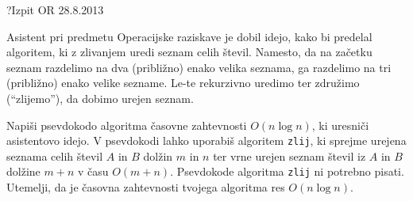 \begin{naloga}{?}{Izpit OR 28.8.2013}
\begin{vprasanje}
Asistent pri predmetu Operacijske raziskave je dobil idejo,
kako bi predelal algoritem, ki z zlivanjem uredi seznam celih števil.
Namesto,
da na začetku seznam razdelimo na dva (približno) enako velika seznama,
ga razdelimo na tri (približno) enako velike sezname.
Le-te rekurzivno uredimo ter združimo (``zlijemo''), da dobimo urejen seznam.

Napiši psevdokodo algoritma časovne zahtevnosti $O(n \log n)$,
ki uresniči asistentovo idejo.
V psevdokodi lahko uporabiš algoritem {\tt zlij},
ki sprejme urejena seznama celih števil $A$ in $B$ dolžin $m$ in $n$
ter vrne urejen seznam števil iz $A$ in $B$ dolžine $m+n$ v času $O(m+n)$.
Psevdokode algoritma {\tt zlij} ni potrebno pisati.
Utemelji, da je časovna zahtevnosti tvojega algoritma res $O(n \log n)$.
\end{vprasanje}
\begin{odgovor}
\end{odgovor}
\end{naloga}
